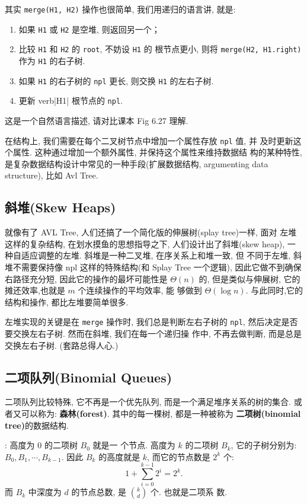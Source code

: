 \documentclass[a4paper]{ctexart}
\theoremstyle{definition}
\theoremstyle{definition}
\begin{document}
其实 \verb|merge(H1, H2)| 操作也很简单, 我们用递归的语言讲, 就是:

\begin{enumerate}
\item 如果 \verb|H1| 或 \verb|H2| 是空堆, 则返回另一个；
\item 比较 \verb|H1| 和 \verb|H2| 的 \verb|root|, 不妨设 \verb|H1| 的
  根节点更小, 则将 \verb|merge(H2, H1.right)| 作为 \verb|H1| 的右子树.
\item 如果 \verb|H1| 的右子树的 \verb|npl| 更长, 则交换 \verb|H1| 的左右子树.
\item 更新 verb|H1| 根节点的 \verb|npl|.
\end{enumerate}

这是一个自然语言描述, 请对比课本 Fig 6.27 理解. 

在结构上, 我们需要在每个二叉树节点中增加一个属性存放 \verb|npl| 值, 并
及时更新这个属性. 这种通过增加一个额外属性, 并保持这个属性来维持数据结
构的某种特性, 是复杂数据结构设计中常见的一种手段(扩展数据结构,
argumenting data structure), 比如 Avl Tree.

\subsection{斜堆(Skew Heaps)}

就像有了 AVL Tree, 人们还搞了一个简化版的伸展树(splay tree)一样, 面对
左堆这样的复杂结构, 在划水摸鱼的思想指导之下, 人们设计出了斜堆(skew
heap), 一种自适应调整的左堆. 斜堆是一种二叉堆, 在序关系上和堆一致, 但
不同于左堆, 斜堆不需要保持像 npl 这样的特殊结构(和 Splay Tree 一个逻辑),
因此它做不到确保右路径充分短, 因此它的操作的最坏可能性是 $\Theta(n)$
的, 但是类似与伸展树, 它的摊还效率,也就是 $m$ 个连续操作的平均效率, 能
够做到 $\Theta(\log n)$. 与此同时,它的结构和操作, 都比左堆要简单很多.

左堆实现的关键是在 \verb|merge| 操作时, 我们总是判断左右子树的
\verb|npl|, 然后决定是否要交换左右子树. 然而在斜堆, 我们在每一个递归操
作中, 不再去做判断, 而是总是交换左右子树. (套路总得人心.)

\subsection{二项队列(Binomial Queues)}

二项队列比较特殊, 它不再是一个优先队列, 而是一个满足堆序关系的树的集合.
或者又可以称为: {\bf 森林(forest)}. 其中的每一棵树, 都是一种被称为{\bf
  二项树(binomial tree)}的数据结构.

: 高度为 $0$ 的二项树 $B_0$ 就是一
个节点. 高度为 $k$ 的二项树 $B_k$, 它的子树分别为: $B_0, B_1, \cdots,
B_{k - 1}$. 因此 $B_k$ 的高度就是 $k$, 而它的节点数是 $2^k$ 个:
$$ 
1 + \sum_{i = 0}^{k - 1} 2^i = 2^k.  
$$
而 $B_k$ 中深度为 $d$ 的节点总数, 是 $k \choose d$ 个. 也就是二项系
数.
\end{document}
